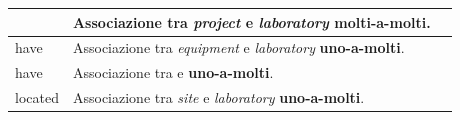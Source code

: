 \begin{tabular}{@{}| p{} | p{} | p{} |}
	\equipmentrequest & \begin{minipage}[t]{0.4\textwidth}
		                    \raggedright
		                    Associazione tra \textit{project} e \textit{laboratory} \textbf{molti-a-molti}.
	                    \end{minipage}
	                  &                                                                                                       \\[15pt]
	\hline
	have              & \begin{minipage}[t]{0.4\textwidth}
		                    \raggedright
		                    Associazione tra \textit{equipment} e \textit{laboratory} \textbf{uno-a-molti}.
	                    \end{minipage}
	                  &                                                                                                       \\[15pt]
	\hline
	have              & \begin{minipage}[t]{0.4\textwidth}
		                    \raggedright
		                    Associazione tra \textit{\baseemp} e \textit{\careerlog} \textbf{uno-a-molti}.
	                    \end{minipage}
	                  &                                                                                                       \\[15pt]
	\hline
	located           & \begin{minipage}[t]{0.4\textwidth}
		                    \raggedright
		                    Associazione tra \textit{site} e \textit{laboratory} \textbf{uno-a-molti}.
	                    \end{minipage}
	                  &                                                                                                       \\[15pt]
	\hline
\end{tabular}

